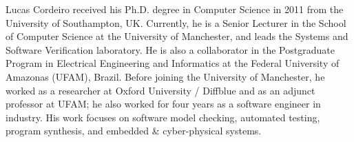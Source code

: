 \documentclass[journal]{IEEEtran}
\begin{document}
\begin{IEEEbiography}
    {Lucas Cordeiro}
received his Ph.D. degree in Computer Science in 2011 from the University of Southampton, UK. Currently, he is a Senior Lecturer in the School of Computer Science at the University of Manchester, and leads the Systems and Software Verification laboratory. He is also a collaborator in the Postgraduate Program in Electrical Engineering and Informatics at the Federal University of Amazonas (UFAM), Brazil. Before joining the University of Manchester, he worked as a researcher at Oxford University / Diffblue and as an adjunct professor at UFAM; he also worked for four years as a software engineer in industry. His work focuses on software model checking, automated testing, program synthesis, and embedded \& cyber-physical systems.
\end{IEEEbiography}





\end{document}

